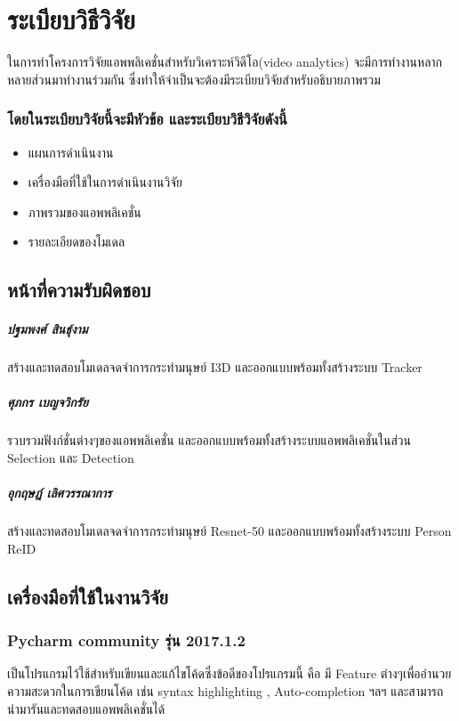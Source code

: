 \chapter{ระเบียบวิธีวิจัย}
ในการทําโครงการวิจัยแอพพลิเคชั่นสำหรับวิเคราะห์วิดีโอ(video analytics) จะมีการทำงานหลากหลายส่วนมาทำงานร่วมกัน ซึ่งทำให้จำเป็นจะต้องมีระเบียบวิจัยสำหรับอธิบายภาพรวม
\subsection*{โดยในระเบียบวิจัยนี้จะมีหัวข้อ และระเบียบวิธีวิจัยดังนี้}
\begin{itemize}\setlength\itemsep{-0.3em}
	\item แผนการดำเนินงาน
	\item เครื่องมือที่ใช้ในการดำเนินงานวิจัย
	\item ภาพรวมของแอพพลิเคชั่น
	\item รายละเอียดของโมเดล
\end{itemize}

\section{หน้าที่ความรับผิดชอบ} 
\paragraph*{ปฐมพงศ์ สินธุ์งาม}
สร้างและทดสอบโมเดลจดจำการกระทำมนุษย์ I3D และออกแบบพร้อมทั้งสร้างระบบ Tracker
\paragraph*{ศุภกร เบญจวิกรัย}
รวบรวมฟังก์ชั่นต่างๆของแอพพลิเคชั่น และออกแบบพร้อมทั้งสร้างระบบแอพพลิเคชั่นในส่วน Selection และ Detection
\paragraph*{อุกฤษฎ์ เลิศวรรณาการ}
สร้างและทดสอบโมเดลจดจำการกระทำมนุษย์ Resnet-50 และออกแบบพร้อมทั้งสร้างระบบ Person ReID 


\vspace{6mm}
\section{เครื่องมือที่ใช้ในงานวิจัย} 
\subsection*{Pycharm community รุ่น 2017.1.2} เป็นโปรแกรมไว้ใช้สำหรับเขียนและแก้ไขโค้ดซึ่งข้อดีของโปรแกรมนี้ คือ มี Feature ต่างๆเพื่ออำนวยความสะดวกในการเขียนโค้ด เช่น syntax highlighting , Auto-completion ฯลฯ  และสามารถนำมารันและทดสอบแอพพลิเคชั่นได้

